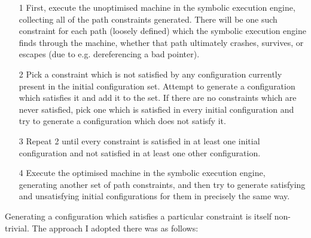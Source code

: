 \begin{itemize}
\item[1] First, execute the unoptimised machine in the symbolic
  execution engine, collecting all of the path constraints generated.
  There will be one such constraint for each path (loosely defined)
  which the symbolic execution engine finds through the machine,
  whether that path ultimately crashes, survives, or escapes (due to
  e.g. dereferencing a bad pointer).
\item[2] Pick a constraint which is not satisfied by any
  configuration currently present in the initial configuration set.
  Attempt to generate a configuration which satisfies it and add it to
  the set.  If there are no constraints which are never satisfied,
  pick one which is satisfied in every initial configuration and try
  to generate a configuration which does not satisfy it.
\item[3] Repeat 2 until every constraint is satisfied in at least one
  initial configuration and not satisfied in at least one other
  configuration.
\item[4] Execute the optimised machine in the symbolic execution
  engine, generating another set of path constraints, and then try to
  generate satisfying and unsatisfying initial configurations for them
  in precisely the same way.
\end{itemize}

Generating a configuration which satisfies a particular constraint is
itself non-trivial.  The approach I adopted there was as follows:

